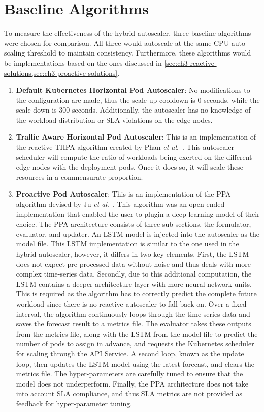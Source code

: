 \section{Baseline Algorithms}
\label{sec:ch6-baseline-algos}

To measure the effectiveness of the hybrid autoscaler, three baseline algorithms were chosen for comparison. All three would autoscale at the same CPU auto-scaling threshold to maintain consistency. Furthermore, these algorithms would be implementations based on the ones discussed in \cref{sec:ch3-reactive-solutions,sec:ch3-proactive-solutions}.\par

\begin{enumerate}
    \item \textbf{Default Kubernetes Horizontal Pod Autoscaler}: No modifications to the configuration are made, thus the scale-up cooldown is 0 seconds, while the scale-down is 300 seconds. Additionally, the autoscaler has no knowledge of the workload distribution or SLA violations on the edge nodes.
    \item \textbf{Traffic Aware Horizontal Pod Autoscaler}: This is an implementation of the reactive THPA algorithm created by Phan \textit{et al}.~\cite{phan2022traffic}. This autoscaler scheduler will compute the ratio of workloads being exerted on the different edge nodes with the deployment pods. Once it does so, it will scale these resources in a commensurate proportion.
    \item \textbf{Proactive Pod Autoscaler}: This is an implementation of the PPA algorithm devised by Ju \textit{et al}.~\cite{ju2021proactive}. This algorithm was an open-ended implementation that enabled the user to plugin a deep learning model of their choice. The PPA architecture consists of three sub-sections, the formulator, evaluator, and updater. An LSTM model is injected into the autoscaler as the model file. This LSTM implementation is similar to the one used in the hybrid autoscaler, however, it differs in two key elements. First, the LSTM does not expect pre-processed data without noise and thus deals with more complex time-series data. Secondly, due to this additional computation, the LSTM contains a deeper architecture layer with more neural network units. This is required as the algorithm has to correctly predict the complete future workload since there is no reactive autoscaler to fall back on. Over a fixed interval, the algorithm continuously loops through the time-series data and saves the forecast result to a metrics file. The evaluator takes these outputs from the metrics file, along with the LSTM from the model file to predict the number of pods to assign in advance, and requests the Kubernetes scheduler for scaling through the API Service. A second loop, known as the update loop, then updates the LSTM model using the latest forecast, and clears the metrics file. The hyper-parameters are carefully tuned to ensure that the model does not underperform. Finally, the PPA architecture does not take into account SLA compliance, and thus SLA metrics are not provided as feedback for hyper-parameter tuning.
\end{enumerate}

